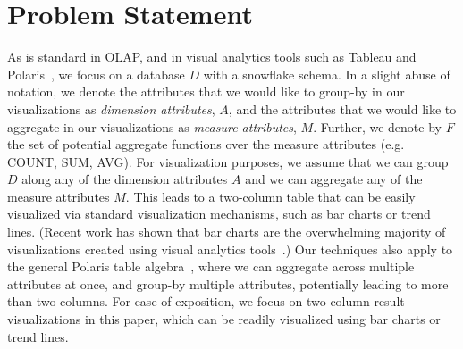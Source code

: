 \section{Problem Statement}
\label{sec:problem_statement}
As is standard in OLAP, and in visual analytics
tools such as Tableau and Polaris~\cite{tableau,polaris},
we focus on a database $D$ with a snowflake schema.
In a slight abuse of notation, we denote the attributes
that we would like to group-by in our visualizations 
as {\em dimension attributes}, $A$, and 
the attributes that we would like to 
aggregate in our visualizations
as {\em measure attributes}, $M$.
Further, we denote by $F$ the set of potential
aggregate functions over the measure attributes (e.g. COUNT, SUM, AVG).  
For visualization purposes, we assume that we can group $D$ along any of the dimension attributes $A$ 
and we can aggregate any of the measure attributes $M$.
This leads to a two-column table that can be easily visualized
via standard visualization mechanisms, such as bar charts or trend lines.
(Recent work has shown that bar charts are the overwhelming majority of visualizations
created using visual analytics tools~\cite{DBLP:journals/pvldb/MortonBGM14}.) 
Our techniques also apply to the general Polaris table algebra~\cite{polaris}, where
we can aggregate across multiple attributes at once, and group-by multiple attributes, 
potentially leading to more than two columns.
For ease of exposition, we focus on two-column result visualizations in this paper,
which can be readily visualized using bar charts or trend lines.

